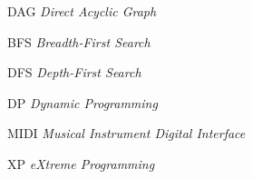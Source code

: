 \begin{siglas}
  \item[DAG] \textit{Direct Acyclic Graph}
  \item[BFS] \textit{Breadth-First Search}
  \item[DFS] \textit{Depth-First Search}
  \item[DP] \textit{Dynamic Programming}
  \item[MIDI] \textit{Musical Instrument Digital Interface}
  \item[XP] \textit{eXtreme Programming}
\end{siglas}
